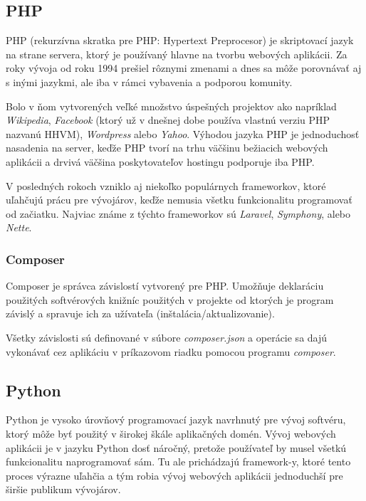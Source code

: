 \subsection*{PHP}

PHP (rekurzívna skratka pre PHP: Hypertext Preprocesor) je skriptovací jazyk na strane servera, ktorý je používaný hlavne na tvorbu webových aplikácii. Za roky vývoja od roku 1994 prešiel rôznymi zmenami a dnes sa môže porovnávať aj s inými jazykmi, ale iba v rámci vybavenia a podporou komunity.

Bolo v ňom vytvorených veľké množstvo úspešných projektov ako napríklad \emph{Wikipedia}, \emph{Facebook} (ktorý už v dnešnej dobe používa vlastnú verziu PHP nazvanú HHVM), \emph{Wordpress} alebo \emph{Yahoo}. Výhodou jazyka PHP je jednoduchosť nasadenia na server, keďže PHP tvorí na trhu väčšinu bežiacich webových aplikácii a drvivá väčšina poskytovateľov hostingu podporuje iba PHP.

V posledných rokoch vzniklo aj niekoľko populárnych frameworkov, ktoré uľahčujú prácu pre vývojárov, keďže nemusia všetku funkcionalitu programovať od začiatku. Najviac známe z týchto frameworkov sú \emph{Laravel}, \emph{Symphony}, alebo \emph{Nette}.

\subsubsection*{Composer}

Composer je správca závislostí vytvorený pre PHP. Umožňuje deklaráciu použitých softvérových knižníc použitých v projekte od ktorých je program závislý a spravuje ich za užívateľa (inštalácia/aktualizovanie). 

Všetky závislosti sú definované v súbore \emph{composer.json} a operácie sa dajú vykonávať cez aplikáciu v príkazovom riadku pomocou programu \emph{composer}.

\subsection*{Python}

Python je vysoko úrovňový programovací jazyk navrhnutý pre vývoj softvéru, ktorý môže byť použitý v širokej škále aplikačných domén. Vývoj webových aplikácii je v jazyku Python dosť náročný, pretože používateľ by musel všetkú funkcionalitu naprogramovať sám. Tu ale prichádzajú framework-y, ktoré tento proces výrazne uľahčia a tým robia vývoj webových aplikácii jednoduchší pre širšie publikum vývojárov.

